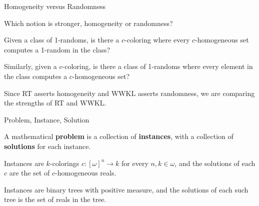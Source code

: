 \begin{frame}{Homogeneity versus Randomness}
  \begin{goal*}
    Which notion is stronger, homogeneity or randomness?
  \end{goal*}

  \vspace{2em}
  Given a class of 1-randoms, is there a $c$-coloring where every
  $c$-homogeneous set computes a 1-random in the class?

  \vspace{2em}
  Similarly, given a $c$-coloring, is there a class of 1-randoms where
  every element in the class computes a $c$-homogeneous set?

  \vspace{2em}
  Since RT asserts homogeneity and WWKL asserts randomness, we are
  comparing the strengths of RT and WWKL.
\end{frame}

\begin{frame}{Problem, Instance, Solution}
  \begin{define*}
    A mathematical \textbf{problem} is a collection of \textbf{instances},
    with a collection of \textbf{solutions} for each instance.
  \end{define*}

  \vspace{2em}
  \begin{example*}[RT is a problem]
    Instances are $k$-colorings $c:[\omega]^n\rightarrow k$ for every
    $n,k\in\omega$, and the solutions of each $c$ are the set of
    $c$-homogeneous reals.
  \end{example*}

  \vspace{2em}
  \begin{example*}
    Instances are binary trees with positive measure, and the solutions of
    each such tree is the set of reals in the tree.
  \end{example*}
\end{frame}

